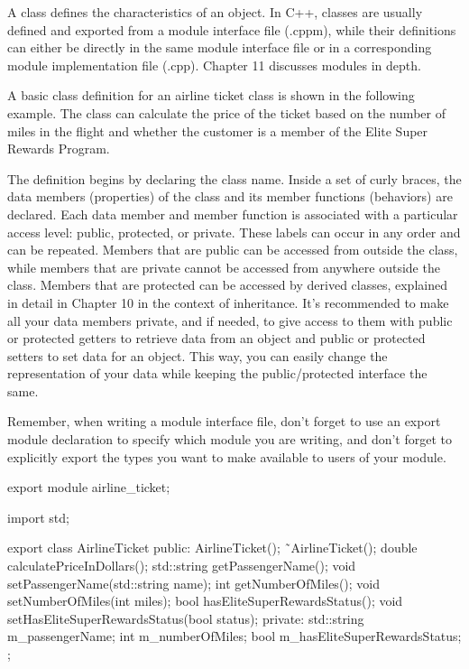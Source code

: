 
A class defines the characteristics of an object. In C++, classes are usually defined and exported from a module interface file (.cppm), while their definitions can either be directly in the same module interface file or in a corresponding module implementation file (.cpp). Chapter 11 discusses modules in depth.

A basic class definition for an airline ticket class is shown in the following example. The class can calculate the price of the ticket based on the number of miles in the flight and whether the customer is a member of the Elite Super Rewards Program.

The definition begins by declaring the class name. Inside a set of curly braces, the data members (properties) of the class and its member functions (behaviors) are declared. Each data member and member function is associated with a particular access level: public, protected, or private. These labels can occur in any order and can be repeated. Members that are public can be accessed from outside the class, while members that are private cannot be accessed from anywhere outside the class. Members that are protected can be accessed by derived classes, explained in detail in Chapter 10 in the context of inheritance. It’s recommended to make all your data members private, and if needed, to give access to them with public or protected getters to retrieve data from an object and public or protected setters to set data for an object. This way, you can easily change the representation of your data while keeping the public/protected interface the same.

Remember, when writing a module interface file, don’t forget to use an export module declaration to specify which module you are writing, and don’t forget to explicitly export the types you want to make available to users of your module.

\begin{cpp}
export module airline_ticket;

import std;

export class AirlineTicket
{
    public:
        AirlineTicket();
        ˜AirlineTicket();
        double calculatePriceInDollars();
        std::string getPassengerName();
        void setPassengerName(std::string name);
        int getNumberOfMiles();
        void setNumberOfMiles(int miles);
        bool hasEliteSuperRewardsStatus();
        void setHasEliteSuperRewardsStatus(bool status);
    private:
        std::string m_passengerName;
        int m_numberOfMiles;
        bool m_hasEliteSuperRewardsStatus;
};
\end{cpp}

